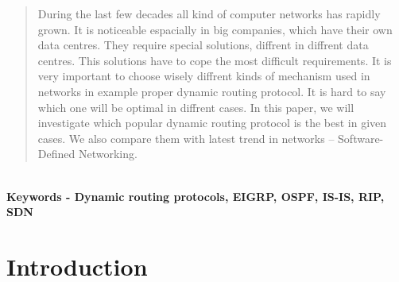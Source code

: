 \documentclass[conference,compsoc]{IEEEtran}
\begin{document}
\maketitle

\begin{abstract}
During the last few decades all kind of computer networks has rapidly grown. It is noticeable espacially in big companies, which have their own data centres. They require  special solutions, diffrent in diffrent data centres. This solutions have to cope the most difficult requirements. It is very important to choose wisely diffrent kinds of mechanism used in networks in example proper dynamic routing protocol. It is hard to say which one will be optimal in diffrent cases. In this paper, we will investigate which popular dynamic routing protocol is the best in given cases. We also compare them with latest trend in networks – Software-Defined Networking.
\end{abstract}


\textbf{\\ Keywords - Dynamic routing protocols, EIGRP, OSPF, IS-IS, RIP, SDN}

\section{Introduction}
\end{document}
